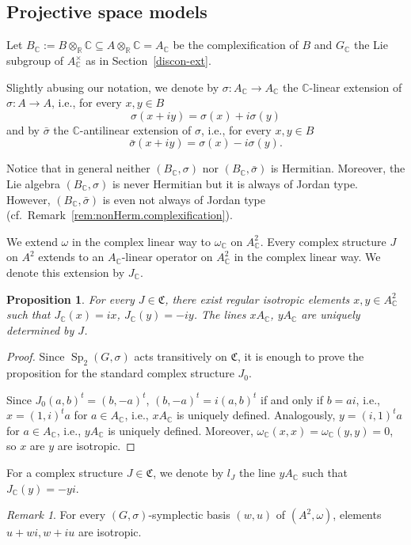 \documentclass[a4paper,oneside,11pt]{amsart}
\DeclareMathOperator{\Sp}{Sp}
\newcommand{\R}{\mathbb R}
\newcommand{\CC}{\mathbb C}
\theoremstyle{plain}
\newtheorem{prop}[teo]{Proposition}
\theoremstyle{definition}
\theoremstyle{remark}
\newtheorem{rem}[teo]{Remark}
\begin{document}
\subsection{Projective space models}

Let $B_\CC:=B\otimes_\R\CC\subseteq A\otimes_\R\CC=A_\CC$ be the complexification of $B$ and $G_\CC$ the Lie subgroup of $A_\mathbb C^\times$ as in Section~\ref{discon-ext}.

Slightly abusing our notation, we denote by $\sigma\colon A_\mathbb C\to A_\mathbb C$ the $\CC$-linear extension of $\sigma\colon A\to A$, i.e., for every $x,y\in B$
$$\sigma(x+iy)=\sigma(x)+i\sigma(y)$$
and by $\bar\sigma$ the $\CC$-antilinear extension of $\sigma$, i.e., for every $x,y\in B$
$$\bar\sigma(x+iy)=\sigma(x)-i\sigma(y).$$

Notice that in general neither $(B_\CC,\sigma)$ nor $(B_\CC,\bar\sigma)$ is Hermitian. Moreover, the Lie algebra $(B_\CC,\sigma)$ is never Hermitian but it is always of Jordan type. However, $(B_\CC,\bar\sigma)$ is even not always of Jordan type (cf.~Remark~\ref{rem:nonHerm.complexification}).


We extend $\omega$ in the complex linear way to $\omega_\CC$ on $A_\CC^2$. Every complex structure $J$  on $A^2$ extends to an $A_\CC$-linear operator on $A^2_\CC$ in the complex linear way. We denote this extension by $J_\CC$.

\begin{prop}
For every $J\in \mathfrak C$, there exist regular isotropic elements $x,y\in A_\CC^2$ such that $J_\CC(x)=ix$, $J_\CC(y)=-iy$. The lines $xA_\CC$, $yA_\CC$ are uniquely determined by $J$.
\end{prop}

\begin{proof}
Since $\Sp_2(G,\sigma)$ acts transitively on $\mathfrak C$, it is enough to prove the proposition for the standard complex structure $J_0$.

Since $J_0(a,b)^t=(b,-a)^t$, $(b,-a)^t=i(a,b)^t$ if and only if $b=ai$, i.e., $x=(1,i)^ta$ for $a\in A_\CC$, i.e., $xA_\CC$ is uniquely defined. Analogously, $y=(i,1)^ta$ for $a\in A_\CC$, i.e., $yA_\CC$ is uniquely defined. Moreover, $\omega_\CC(x,x)=\omega_\CC(y,y)=0$, so $x$ are $y$ are isotropic.
\end{proof}

For a complex structure $J\in\mathfrak C$, we denote by $l_J$ the line $yA_\CC$ such that $J_\CC(y)=-yi$.

\begin{rem}
For every $(G,\sigma)$-symplectic basis $(w,u)$ of $(A^2,\omega)$, elements $u+wi, w+iu$ are isotropic.
\end{rem}
\end{document}
